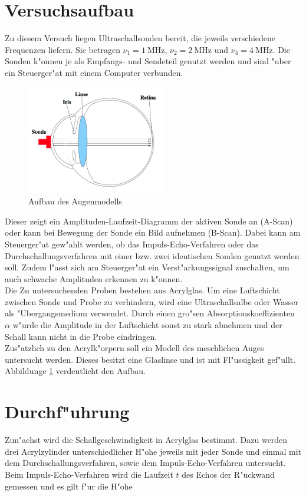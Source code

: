\section{Versuchsaufbau} %
\label{sec:durchf_uhrung}
	Zu diesem Versuch liegen Ultraschallsonden bereit, die jeweils verschiedene Frequenzen liefern.
	Sie betragen $\nu_1 = \SI{1}{\mega \hertz}$, $\nu_2 = \SI{2}{\mega \hertz}$ und $\nu_4 = \SI{4}{\mega \hertz}$.
	Die Sonden k"onnen je als Empfangs- und Sendeteil genutzt werden und sind "uber ein Steuerger"at mit einem Computer verbunden.

	\begin{figure}
		\centering
		\includegraphics[width = 6cm]{img/auge.jpeg}
		\caption{Aufbau des Augenmodells \label{fig:auge}}
	\end{figure}

	Dieser zeigt ein Amplituden-Laufzeit-Diagramm der aktiven Sonde an (A-Scan) oder kann bei Bewegung der Sonde ein Bild aufnehmen (B-Scan).
	Dabei kann am Steuerger"at gew"ahlt werden, ob das Impuls-Echo-Verfahren oder das Durchschallungsverfahren mit einer bzw. zwei identischen Sonden genutzt werden soll.
	Zudem l"asst sich am Steuerger"at ein Verst"arkungssignal zuschalten, um auch schwache Amplituden erkennen zu k"onnen. \\

	Die Zu untersuchenden Proben bestehen aus Acrylglas.
	Um eine Luftschicht zwischen Sonde und Probe zu verhindern, wird eine Ultraschallsalbe oder Wasser als "Ubergangsmedium verwendet.
	Durch einen gro"sen Absorptionskoeffizienten $\alpha$ w"urde die Amplitude in der Luftschicht sonst zu stark abnehmen und der Schall kann nicht in die Probe eindringen. \\

	Zus"atzlich zu den Acrylk"orpern soll ein Modell des meschlichen Auges untersucht werden.
	Dieses besitzt eine Glaslinse und ist mit Fl"ussigkeit gef"ullt.
	Abbildunge \ref{fig:auge} verdeutlicht den Aufbau.
	
\section{Durchf"uhrung}
\label{sec:durchfuehrung}
	Zun"achst wird die Schallgeschwindigkeit in Acrylglas bestimmt.
	Dazu werden drei Acrylzylinder unterschiedlicher H"ohe jeweils mit jeder Sonde und einmal mit dem Durchschallungsverfahren, sowie dem Impuls-Echo-Verfahren untersucht.
	Beim Impuls-Echo-Verfahren wird die Laufzeit $t$ des Echos der R"uckwand gemessen und es gilt f"ur die H"ohe

